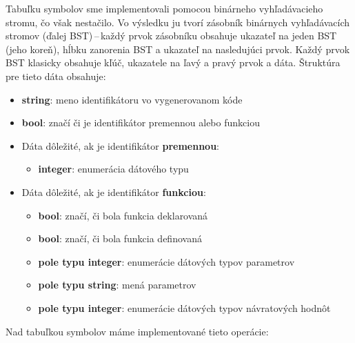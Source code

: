 \documentclass[a4paper, 12pt]{article}
\begin{document}
Tabuľku symbolov sme implementovali pomocou binárneho vyhľadávacieho stromu, čo však nestačilo. Vo výsledku ju tvorí zásobník binárnych vyhľadávacích stromov (ďalej BST)\,--\,každý prvok zásobníku obsahuje ukazateľ na jeden BST (jeho koreň), hĺbku zanorenia BST a ukazateľ na nasledujúci prvok. Každý prvok BST klasicky obsahuje kľúč, ukazatele na ľavý a pravý prvok a dáta. Štruktúra pre tieto dáta obsahuje:
\begin{itemize}
    \item \textbf{string}: meno identifikátoru vo vygenerovanom kóde
    \item \textbf{bool}: značí či je identifikátor premennou alebo funkciou
    \item Dáta dôležité, ak je identifikátor \textbf{premennou}:
    \begin{itemize}
        \item \textbf{integer}: enumerácia dátového typu
    \end{itemize}
    \item Dáta dôležité, ak je identifikátor \textbf{funkciou}:
    \begin{itemize}
        \item \textbf{bool}: značí, či bola funkcia deklarovaná
        \item \textbf{bool}: značí, či bola funkcia definovaná
        \item \textbf{pole typu integer}: enumerácie dátových typov parametrov
        \item \textbf{pole typu string}: mená parametrov
        \item \textbf{pole typu integer}: enumerácie dátových typov návratových hodnôt
    \end{itemize}
\end{itemize}
Nad tabuľkou symbolov máme implementované tieto operácie:
\end{document}
